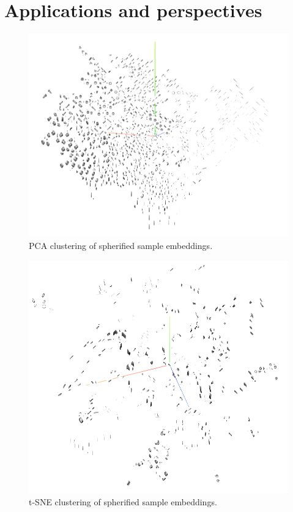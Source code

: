 \chapter{Applications and perspectives}
\label{chap:applications}

\begin{figure}[]
    \centering
    \includegraphics[width=0.7\columnwidth]{images/clusters_pca.png}
    \caption{PCA clustering of spherified sample embeddings.}
    \label{fig:pca_clusters}
\end{figure}

\begin{figure}[]
    \centering
    \includegraphics[width=0.7\columnwidth]{images/clusters_tsne.png}
    \caption{t-SNE clustering of spherified sample embeddings.}
    \label{fig:tsne_clusters}
\end{figure}

